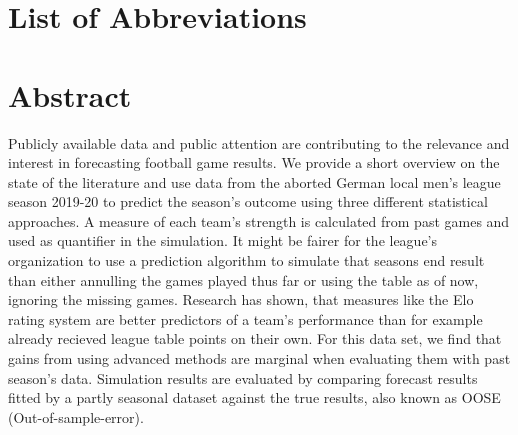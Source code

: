 \documentclass[12pt,a4paper]{article}
\begin{document}
\newpage
\listoffigures
{}

\listoftables
{}

\section*{List of Abbreviations}

\begin{adjustwidth}{1.5em}{0pt}

\begin{acronym}[dummyyyy]


\end{acronym}

\end{adjustwidth}

\restoregeometry

\newpage
{}
\hypertarget{abstract}{%
\section{Abstract}\label{abstract}}

Publicly available data and public attention are contributing to the
relevance and interest in forecasting football game results. We provide
a short overview on the state of the literature and use data from the
aborted German local men's league season 2019-20 to predict the season's
outcome using three different statistical approaches. A measure of each
team's strength is calculated from past games and used as quantifier in
the simulation. It might be fairer for the league's organization to use
a prediction algorithm to simulate that seasons end result than either
annulling the games played thus far or using the table as of now,
ignoring the missing games. Research has shown, that measures like the
Elo rating system are better predictors of a team's performance than for
example already recieved league table points on their own. For this data
set, we find that gains from using advanced methods are marginal when
evaluating them with past season's data. Simulation results are
evaluated by comparing forecast results fitted by a partly seasonal
dataset against the true results, also known as OOSE
(Out-of-sample-error).
\end{document}
